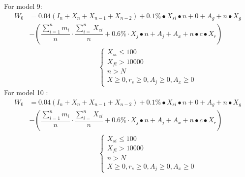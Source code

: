 \documentclass[../mcmpaper]{subfiles}
\begin{document}
For model 9:
\begin{equation}
\begin{aligned}
W_{0}&=0.04\left(I_{n}+X_{n}+X_{n-1}+X_{n-2}\right)+0.1 \% \bullet X_{s i} \bullet n+0+A_{g}+n \bullet X_{g} \\
&-\left(\dfrac{\sum_{i=1}^{n} m_{i}}{n} \cdot \dfrac{\sum_{i=}^{n} X_{c i}}{n}+0.6\% \cdot X_{j} \bullet n+A_{j}+A_{x}+n \bullet c \bullet X_{r}\right) \\
&\hspace{10em}\left\{\begin{array}{l}
X_{s i} \leq 100 \\
X_{f i}>10000 \\
n>N \\
X \geq 0, r_{s} \geq 0, A_{j} \geq 0, A_{x} \geq 0
\end{array}\right.
\end{aligned}
\end{equation}
For model 10   :
\begin{equation}
\begin{aligned}
W_{0}&=0.04\left(I_{n}+X_{n}+X_{n-1}+X_{n-2}\right)+0.1 \% \bullet X_{s i} \bullet n+0+A_{g}+n \bullet X_{g} \\
&-\left(\dfrac{\sum_{i=1}^{n} m_{i}}{n} \cdot \dfrac{\sum_{i=}^{n} X_{c i}}{n}+0.6\% \cdot X_{j} \bullet n+A_{j}+A_{x}+n \bullet c \bullet X_{r}\right) \\
&\hspace{10em}\left\{\begin{array}{l}
X_{s i} \leq 100 \\
X_{f i}>10000 \\
n>N \\
X \geq 0, r_{s} \geq 0, A_{j} \geq 0, A_{x} \geq 0
\end{array}\right.
\end{aligned}
\end{equation}
\end{document}
